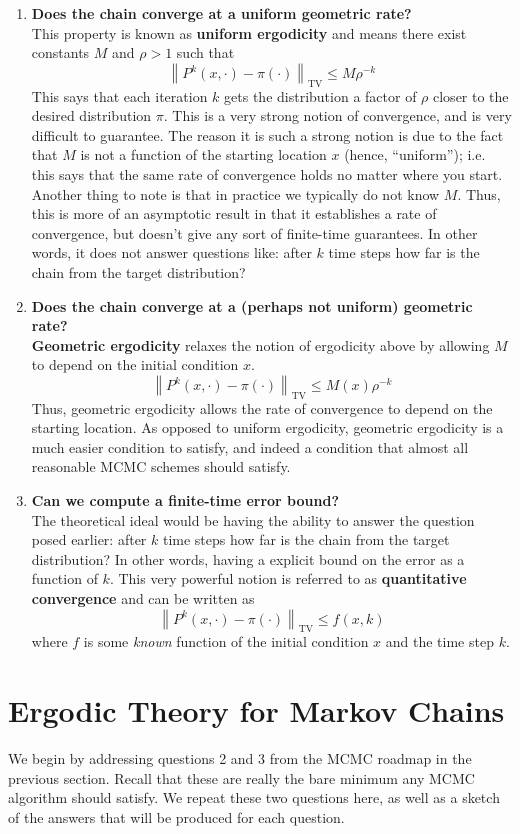 \documentclass[12pt]{article}
\newcommand*{\norm}[1]{\left\lVert#1\right\rVert}
\begin{document}
\begin{enumerate}
\item \textbf{Does the chain converge at a uniform geometric rate?} \\
This property is known as \textbf{uniform ergodicity} and means there exist constants $M$ and $\rho > 1$ such that 
\[\norm{P^k(x, \cdot) - \pi(\cdot)}_{\text{TV}} \leq M\rho^{-k}\]
This says that each iteration $k$ gets the distribution a factor of $\rho$ closer to the desired distribution $\pi$. This is a very strong notion of convergence, and is very difficult to guarantee. The reason it 
is such a strong notion is due to the fact that $M$ is not a function of the starting location $x$ (hence, ``uniform''); i.e. this says that the same rate of convergence holds no matter where you start. Another thing to note is that 
in practice we typically do not know $M$. Thus, this is more of an asymptotic result in that it establishes a rate of convergence, but doesn't give any sort of finite-time guarantees. In other words, it does 
not answer questions like: after $k$ time steps how far is the chain from the target distribution? 

\item \textbf{Does the chain converge at a (perhaps not uniform) geometric rate?} \\
\textbf{Geometric ergodicity} relaxes the notion of ergodicity above by allowing $M$ to depend on the initial condition $x$. 
\[\norm{P^k(x, \cdot) - \pi(\cdot)}_{\text{TV}} \leq M(x)\rho^{-k}\]
Thus, geometric ergodicity allows the rate of convergence to depend on the starting location. As opposed to uniform ergodicity, geometric ergodicity is a much easier condition to satisfy, and indeed 
a condition that almost all reasonable MCMC schemes should satisfy. 

\item \textbf{Can we compute a finite-time error bound?} \\
The theoretical ideal would be having the ability to answer the question posed earlier: after $k$ time steps how far is the chain from the target distribution? In other words, having a explicit bound on the error 
as a function of $k$. This very powerful notion is referred to as \textbf{quantitative convergence} and can be written as 
\[\norm{P^k(x, \cdot) - \pi(\cdot)}_{\text{TV}} \leq f(x, k)\]
where $f$ is some \textit{known} function of the initial condition $x$ and the time step $k$. 
\end{enumerate}

\section{Ergodic Theory for Markov Chains}
We begin by addressing questions 2 and 3 from the MCMC roadmap in the previous section. Recall that these are really the bare minimum any MCMC algorithm should satisfy. We repeat these two questions 
here, as well as a sketch of the answers that will be produced for each question. 
\end{document}
